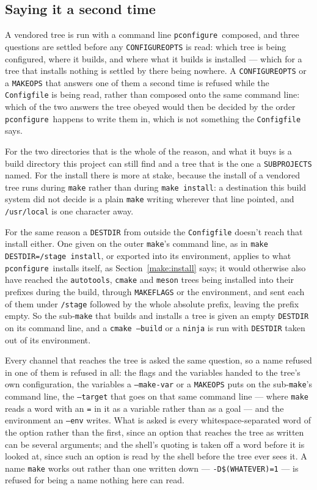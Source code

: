 \documentclass{article}
\newcommand{\pconfigure}{\texttt{pconfigure}}
\begin{document}
\subsection{Saying it a second time \label{buildsys:second_answer}}

A vendored tree is run with a command line \pconfigure\ composed, and
three questions are settled before any \texttt{CONFIGUREOPTS} is read:
which tree is being configured, where it builds, and where what it
builds is installed --- which for a tree that installs nothing is
settled by there being nowhere.  A \texttt{CONFIGUREOPTS} or a
\texttt{MAKEOPS} that answers one of them a second time is refused
while the \texttt{Configfile} is being read, rather than composed
onto the same command line: which of the two answers the tree obeyed
would then be decided by the order \pconfigure\ happens to write them
in, which is not something the \texttt{Configfile} says.

For the two directories that is the whole of the reason, and what it
buys is a build directory this project can still find and a tree that
is the one a \texttt{SUBPROJECTS} named.  For the install there is
more at stake, because the install of a vendored tree runs during
\texttt{make} rather than during \texttt{make install}: a destination
this build system did not decide is a plain \texttt{make} writing
wherever that line pointed, and \texttt{/usr/local} is one character
away.

For the same reason a \texttt{DESTDIR} from outside the
\texttt{Configfile} doesn't reach that install either.  One given on
the outer \texttt{make}'s command line, as in \texttt{make
DESTDIR=/stage install}, or exported into its environment, applies to
what \pconfigure\ installs itself, as Section~\ref{make:install}
says; it would otherwise also have reached the \texttt{autotools},
\texttt{cmake} and \texttt{meson} trees being installed into their
prefixes during the build, through \texttt{MAKEFLAGS} or the
environment, and sent each of them under \texttt{/stage} followed by
the whole absolute prefix, leaving the prefix empty.  So the
sub-\texttt{make} that builds and installs a tree is given an empty
\texttt{DESTDIR} on its command line, and a \texttt{cmake --build} or
a \texttt{ninja} is run with \texttt{DESTDIR} taken out of its
environment.

Every channel that reaches the tree is asked the same question, so a
name refused in one of them is refused in all: the flags and the
variables handed to the tree's own configuration, the variables a
\texttt{--make-var} or a \texttt{MAKEOPS} puts on the
sub-\texttt{make}'s command line, the \texttt{--target} that goes on
that same command line --- where \texttt{make} reads a word with an
\texttt{=} in it as a variable rather than as a goal --- and the
environment an \texttt{--env} writes.  What is asked is every
whitespace-separated word of the option rather than the first, since
an option that reaches the tree as written can be several arguments;
and the shell's quoting is taken off a word before it is looked at,
since such an option is read by the shell before the tree ever sees
it.  A name \texttt{make}
works out rather than one written down --- \texttt{-D\$(WHATEVER)=1}
--- is refused for being a name nothing here can read.
\end{document}
